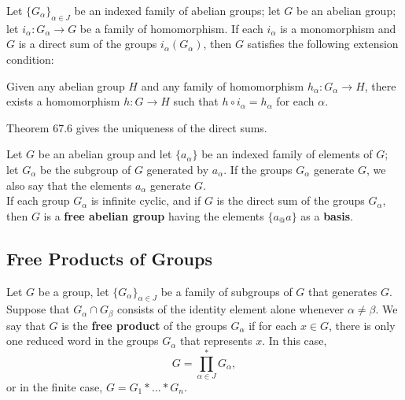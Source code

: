 \begin{lemma*}
    Let $\{G_\alpha\}_{\alpha \in J}$ be an indexed family of abelian groups; let $G$ be an abelian group; let $i_\alpha \colon G_\alpha \rightarrow G$ be a family of homomorphism. If each $i_\alpha$ is a monomorphism and $G$ is a direct sum of the groups $i_\alpha(G_\alpha)$, then $G$ satisfies the following extension condition: \\
    
    \begin{addmargin}{1em}
    Given any abelian group $H$ and any family of homomorphism $h_\alpha \colon G_\alpha \rightarrow H$, there exists a homomorphism $h \colon G \rightarrow H$ such that $h \circ i_\alpha = h_\alpha$ for each $\alpha$. \\
    \end{addmargin}
\end{lemma*}

Theorem 67.6 gives the uniqueness of the direct sums.

\begin{definition}
Let $G$ be an abelian group and let $\{ a_\alpha \}$ be an indexed family of elements of $G$; let $G_\alpha$ be the subgroup of $G$ generated by $a_\alpha$. If the groups $G_\alpha$ generate $G$, we 
also say that the elements $a_\alpha$ generate $G$. \\

If each group $G_\alpha$ is infinite cyclic, and if $G$ is the direct sum of the groups $G_\alpha$, then $G$ is a \textbf{free abelian group} having the elements $\{ a_@a
\}$ as a \textbf{basis}.
\end{definition}


\subsection{Free Products of Groups}

\begin{definition}
Let $G$ be a group, let $\{ G_\alpha \}_{\alpha \in J}$ be a family of subgroups of $G$ that generates $G$. Suppose that
$G_\alpha \cap G_\beta$ consists of the identity element alone whenever $\alpha \neq \beta$. We say that $G$ is the \textbf{free product} of the groups $G_\alpha$ if for each $x \in G$,
there is only one reduced word in the groups $G_\alpha$ that represents $x$. In this case,
\[
    G = \prod_{\alpha \in J}^* G_\alpha,
\]
or in the finite case, $G = G_1 * \dots * G_n$. 
\end{definition}

